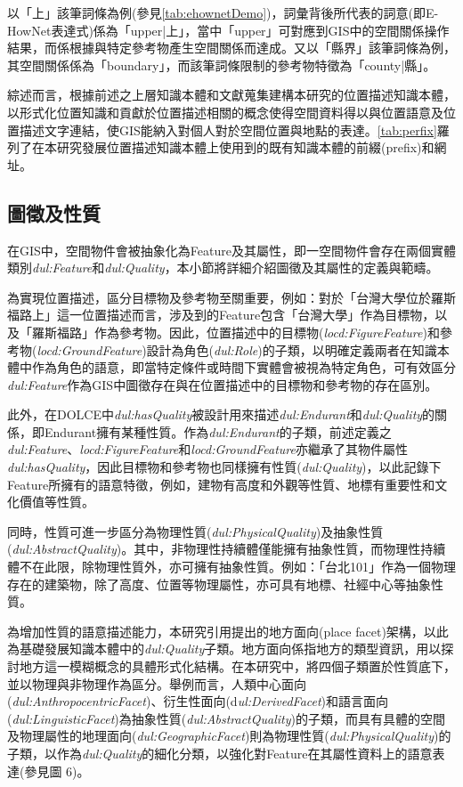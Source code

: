 以「上」該筆詞條為例(參見\ref{tab:ehownetDemo})，詞彙背後所代表的詞意(即E-HowNet表達式)係為「upper|上」，當中「upper」可對應到GIS中的空間關係操作結果，而係根據與特定參考物產生空間關係而達成。又以「縣界」該筆詞條為例，其空間關係係為「boundary」，而該筆詞條限制的參考物特徵為「county|縣」。

綜述而言，根據前述之上層知識本體和文獻蒐集建構本研究的位置描述知識本體，以形式化位置知識和貢獻於位置描述相關的概念使得空間資料得以與位置語意及位置描述文字連結，使GIS能納入對個人對於空間位置與地點的表達。\ref{tab:perfix}羅列了在本研究發展位置描述知識本體上使用到的既有知識本體的前綴(prefix)和網址。





\subsection{圖徵及性質}

在GIS中，空間物件會被抽象化為Feature及其屬性，即一空間物件會存在兩個實體類別\textit{dul:Feature}和\textit{dul:Quality}，本小節將詳細介紹圖徵及其屬性的定義與範疇。

為實現位置描述，區分目標物及參考物至關重要，例如：對於「台灣大學位於羅斯福路上」這一位置描述而言，涉及到的Feature包含「台灣大學」作為目標物，以及「羅斯福路」作為參考物。因此，位置描述中的目標物(\textit{locd:FigureFeature})和參考物(\textit{locd:GroundFeature})設計為角色(\textit{dul:Role})的子類，以明確定義兩者在知識本體中作為角色的語意，即當特定條件或時間下實體會被視為特定角色，可有效區分\textit{dul:Feature}作為GIS中圖徵存在與在位置描述中的目標物和參考物的存在區別。

此外，在DOLCE中\textit{dul:hasQuality}被設計用來描述\textit{dul:Endurant}和\textit{dul:Quality}的關係，即Endurant擁有某種性質。作為\textit{dul:Endurant}的子類，前述定義之\textit{dul:Feature}、\textit{locd:FigureFeature}和\textit{locd:GroundFeature}亦繼承了其物件屬性\textit{dul:hasQuality}，因此目標物和參考物也同樣擁有性質(\textit{dul:Quality})，以此記錄下Feature所擁有的語意特徵，例如，建物有高度和外觀等性質、地標有重要性和文化價值等性質。

同時，性質可進一步區分為物理性質(\textit{dul:PhysicalQuality})及抽象性質(\textit{dul:AbstractQuality})。其中，非物理性持續體僅能擁有抽象性質，而物理性持續體不在此限，除物理性質外，亦可擁有抽象性質。例如：「台北101」作為一個物理存在的建築物，除了高度、位置等物理屬性，亦可具有地標、社經中心等抽象性質。

為增加性質的語意描述能力，本研究引用\citet{RN39}提出的地方面向(place facet)架構，以此為基礎發展知識本體中的\textit{dul:Quality}子類。地方面向係指地方的類型資訊，用以探討地方這一模糊概念的具體形式化結構。在本研究中，將四個子類置於性質底下，並以物理與非物理作為區分。舉例而言，人類中心面向(\textit{dul:AnthropocentricFacet})、衍生性面向(d\textit{ul:DerivedFacet})和語言面向(\textit{dul:LinguisticFacet})為抽象性質(\textit{dul:AbstractQuality})的子類，而具有具體的空間及物理屬性的地理面向(\textit{dul:GeographicFacet})則為物理性質(\textit{dul:PhysicalQuality})的子類，以作為\textit{dul:Quality}的細化分類，以強化對Feature在其屬性資料上的語意表達(參見圖 6)。

